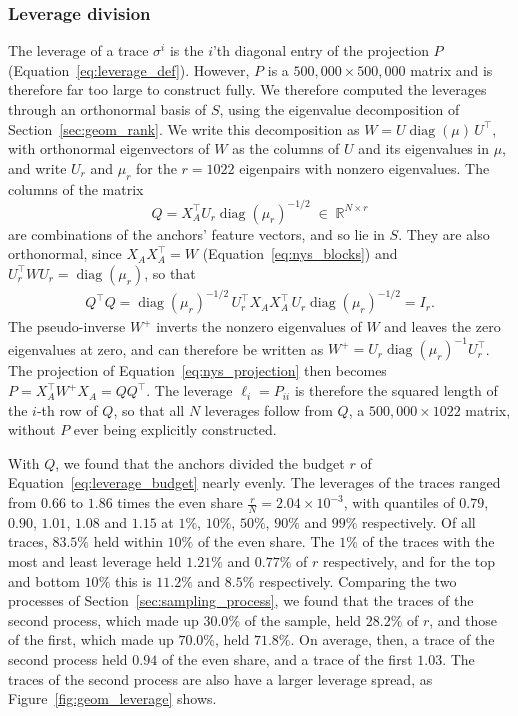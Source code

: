 \documentclass[titlepage,a4paper,11pt]{report}
\begin{document}
    \subsubsection{Leverage division}\label{sec:geom_leverage}
    The leverage of a trace $\sigma^i$ is the $i$'th diagonal entry of the projection $P$ (Equation~\eqref{eq:leverage_def}). However, $P$ is a $500{,}000\times500{,}000$ matrix and is therefore far too large to construct fully. We therefore computed the leverages through an orthonormal basis of $S$, using the eigenvalue decomposition of Section~\ref{sec:geom_rank}. We write this decomposition as $W=U\operatorname{diag}(\mu)\,U^\top$, with orthonormal eigenvectors of $W$ as the columns of $U$ and its eigenvalues in $\mu$, and write $U_r$ and $\mu_r$ for the $r=1022$ eigenpairs with nonzero eigenvalues. The columns of the matrix
    \begin{equation}\label{eq:anchor_basis}
        Q=X_A^\top U_r\operatorname{diag}(\mu_r)^{-1/2}\;\in\;\mathbb R^{N\times r}
    \end{equation}
    are combinations of the anchors' feature vectors, and so lie in $S$. They are also orthonormal, since $X_AX_A^\top=W$ (Equation~\eqref{eq:nys_blocks}) and $U_r^\top WU_r=\operatorname{diag}(\mu_r)$, so that 
    \begin{align*}
    Q^\top Q=\operatorname{diag}(\mu_r)^{-1/2}\,U_r^\top X_AX_A^\top \,U_r\operatorname{diag}(\mu_r)^{-1/2}=I_r.
    \end{align*}
    The pseudo-inverse $W^+$ inverts the nonzero eigenvalues of $W$ and leaves the zero eigenvalues at zero, and can therefore be written as $W^{+}=U_r\operatorname{diag}(\mu_r)^{-1}U_r^\top$. The projection of Equation~\eqref{eq:nys_projection} then becomes $P=X_A^\top W^{+}X_A=QQ^\top$. The leverage $\ell_i=P_{ii}$ is therefore the squared length of the $i$-th row of $Q$, so that all $N$ leverages follow from $Q$, a $500{,}000\times1022$ matrix, without $P$ ever being explicitly constructed.
    
    With $Q$, we found that the anchors divided the budget $r$ of Equation~\eqref{eq:leverage_budget} nearly evenly. The leverages of the traces ranged from $0.66$ to $1.86$ times the even share $\frac rN=2.04\times10^{-3}$, with quantiles of $0.79$, $0.90$, $1.01$, $1.08$ and $1.15$ at $1\%$, $10\%$, $50\%$, $90\%$ and $99\%$ respectively. Of all traces, $83.5\%$ held within $10\%$ of the even share. The $1\%$ of the traces with the most and least leverage held $1.21\%$ and $0.77\%$ of $r$ respectively, and for the top and bottom  $10\%$ this is $11.2\%$ and $8.5\%$ respectively. Comparing the two processes of Section~\ref{sec:sampling_process}, we found that the traces of the second process, which made up $30.0\%$ of the sample, held $28.2\%$ of $r$, and those of the first, which made up $70.0\%$, held $71.8\%$. On average, then, a trace of the second process held $0.94$ of the even share, and a trace of the first $1.03$. The traces of the second process are also have a larger leverage spread, as Figure~\ref{fig:geom_leverage} shows.
\end{document}
